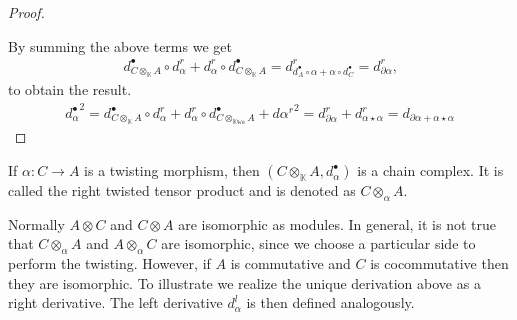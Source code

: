 \documentclass[../thesis.tex]{subfiles}
\begin{document}
\begin{proof}
\begin{center}
\begin{tikzpicture}
                    \end{tikzpicture}
                \end{center}

                By summing the above terms we get 
                \begin{align*}
                    d_{C\otimes_\mathbb{K}A}^\bullet\circ d_\alpha^r + d_\alpha^r\circ d_{C\otimes_\mathbb{K} A}^\bullet = d_{d_A^\bullet\circ\alpha + \alpha\circ d_C^\bullet}^r = d_{\partial\alpha}^r\text{,}
                \end{align*}
                to obtain the result.
                \begin{align*}
                    {d_\alpha^\bullet}^2 = d_{C\otimes_\mathbb{K}A}^\bullet \circ d_\alpha^r + d_\alpha^r \circ d_{C\otimes_\mathbb{Kwe}A}^\bullet + {d\alpha^r}^2 = d_{\partial \alpha}^r + d_{\alpha\star\alpha}^r = d_{\partial \alpha + \alpha\star\alpha}
                \end{align*}
            \end{proof}

            \begin{corollary}
                If $\alpha:C\rightarrow A$ is a twisting morphism, then $(C\otimes_\mathbb{K}A, d_\alpha^\bullet)$ is a chain complex. It is called the right twisted tensor product and is denoted as $C\otimes_\alpha A$.
            \end{corollary}

            Normally $A\otimes C$ and $C\otimes A$ are isomorphic as modules. In general, it is not true that $C\otimes_\alpha A$ and $A\otimes_\alpha C$ are isomorphic, since we choose a particular side to perform the twisting. However, if $A$ is commutative and $C$ is cocommutative then they are isomorphic. To illustrate we realize the unique derivation above as a right derivative. The left derivative $d_\alpha^l$ is then defined analogously.
            \begin{center}
            \end{center}
\end{document}
